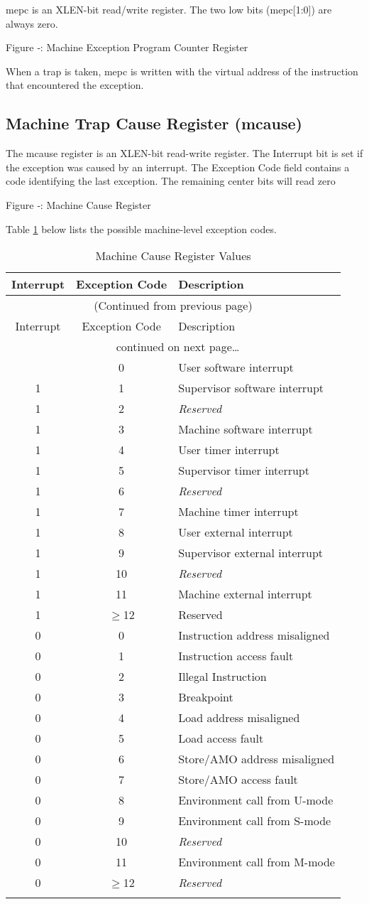 mepc is an XLEN-bit read/write register. The two low bits
(mepc{[}1:0{]}) are always zero.

\missingfigure{}

Figure ‑: Machine Exception Program Counter Register

When a trap is taken, mepc is written with the virtual address of the
instruction that encountered the exception.

\subsection{Machine Trap Cause Register
(mcause)}\label{machine-trap-cause-register-mcause}

The mcause register is an XLEN-bit read-write register. The Interrupt
bit is set if the exception was caused by an interrupt. The Exception
Code field contains a code identifying the last exception. The remaining
center bits will read zero

\missingfigure{}

Figure ‑: Machine Cause Register

Table \ref{tab:mcause-reg-values} below lists the possible machine-level exception codes.

\begin{longtable}[]{@{}ccl@{}}
\toprule
Interrupt & Exception Code & Description\tabularnewline
\midrule
\endfirsthead
\multicolumn{3}{c}{{(Continued from previous page)}} \\

\toprule
Interrupt & Exception Code & Description\tabularnewline
\midrule
\endhead

\midrule \multicolumn{3}{c}{{\tablename\ \thetable{} continued on next page\ldots}} \\
\endfoot

\endlastfoot
1 & 0 & User software interrupt\tabularnewline
1 & 1 & Supervisor software interrupt\tabularnewline
1 & 2 & \emph{Reserved}\tabularnewline
1 & 3 & Machine software interrupt\tabularnewline
1 & 4 & User timer interrupt\tabularnewline
1 & 5 & Supervisor timer interrupt\tabularnewline
1 & 6 & \emph{Reserved}\tabularnewline
1 & 7 & Machine timer interrupt\tabularnewline
1 & 8 & User external interrupt\tabularnewline
1 & 9 & Supervisor external interrupt\tabularnewline
1 & 10 & \emph{Reserved}\tabularnewline
1 & 11 & Machine external interrupt\tabularnewline
1 & $\geqslant$12 & Reserved\tabularnewline
\midrule
0 & 0 & Instruction address misaligned\tabularnewline
0 & 1 & Instruction access fault\tabularnewline
0 & 2 & Illegal Instruction\tabularnewline
0 & 3 & Breakpoint\tabularnewline
0 & 4 & Load address misaligned\tabularnewline
0 & 5 & Load access fault\tabularnewline
0 & 6 & Store/AMO address misaligned\tabularnewline
0 & 7 & Store/AMO access fault\tabularnewline
0 & 8 & Environment call from U-mode\tabularnewline
0 & 9 & Environment call from S-mode\tabularnewline
0 & 10 & \emph{Reserved}\tabularnewline
0 & 11 & Environment call from M-mode\tabularnewline
0 & $\geqslant$12 & \emph{Reserved}\tabularnewline
\bottomrule
\caption{Machine Cause Register Values}
\label{tab:mcause-reg-values}
\end{longtable}


